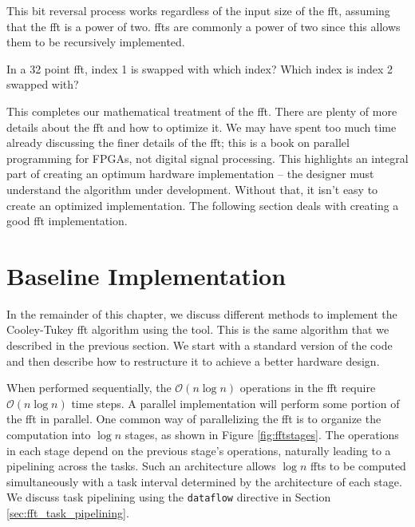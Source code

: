 This bit reversal process works regardless of the input size of the \gls{fft}, assuming that the \gls{fft} is a power of two. \glspl{fft} are commonly a power of two since this allows them to be recursively implemented.

\begin{exercise}
In a 32 point \gls{fft}, index 1 is swapped with which index? Which index is index 2 swapped with?
\end{exercise}

This completes our mathematical treatment of the \gls{fft}. There are plenty of more details about the \gls{fft} and how to optimize it. We may have spent too much time already discussing the finer details of the \gls{fft}; this is a book on parallel programming for FPGAs, not digital signal processing. This highlights an integral part of creating an optimum hardware implementation -- the designer must understand the algorithm under development. Without that, it isn't easy to create an optimized implementation. The following section deals with creating a good \gls{fft} implementation. 

\section{Baseline Implementation}

In the remainder of this chapter, we discuss different methods to implement the Cooley-Tukey \gls{fft} \cite{cooley65} algorithm using the \VHLS tool. This is the same algorithm that we described in the previous section. We start with a standard version of the code and then describe how to restructure it to achieve a better hardware design. 

When performed sequentially, the $\mathcal{O}(n \log n)$ operations in the \gls{fft} require $\mathcal{O}(n \log n)$ time steps.   A parallel implementation will perform some portion of the \gls{fft} in parallel.  One common way of parallelizing the \gls{fft} is to organize the computation into $\log n$ stages, as shown in Figure \ref{fig:fftstages}.  The operations in each stage depend on the previous stage's operations, naturally leading to a pipelining across the tasks.  Such an architecture allows $\log n$ \glspl{fft} to be computed simultaneously with a task interval determined by the architecture of each stage.  We discuss task pipelining using the \lstinline|dataflow| directive in Section \ref{sec:fft_task_pipelining}.

